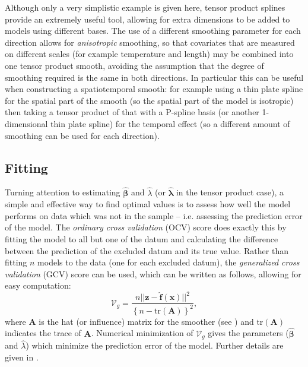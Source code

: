 Although only a very simplistic example is given here, tensor product splines provide an extremely useful tool, allowing for extra dimensions to be added to models using different bases. The use of a different smoothing parameter for each direction allows for \textit{anisotropic} smoothing, so that covariates that are measured on different scales (for example temperature and length) may be combined into one tensor product smooth, avoiding the assumption that the degree of smoothing required is the same in both directions. In particular this can be useful when constructing a spatiotemporal smooth: for example using a thin plate spline for the spatial part of the smooth (so the spatial part of the model is isotropic) then taking a tensor product of that with a P-spline basis (or another 1-dimensional thin plate spline) for the temporal effect (so a different amount of smoothing can be used for each direction).

\subsection{Fitting}
\label{GAMfitting}

Turning attention to estimating $\bm{\hat{\beta}}$ and $\hat{\lambda}$ (or $\hat{\bm{\lambda}}$ in the tensor product case), a simple and effective way to find optimal values is to assess how well the model performs on data which was not in the sample -- i.e. assessing the prediction error of the model. The \textit{ordinary cross validation} (OCV) score does exactly this by fitting the model to all but one of the datum and calculating the difference between the prediction of the excluded datum and its true value. Rather than fitting $n$ models to the data (one for each excluded datum), the \textit{generalized cross validation} (GCV) score can be used, which can be written as follows, allowing for easy computation:
\begin{equation}
\mathcal{V}_g = \frac{n \lvert\lvert \mathbf{z} - \mathbf{\hat{f}}(\mathbf{x})\rvert \rvert^2}{\left \{n-\text{tr}(\mathbf{A}) \right \}^2},
\label{intro-GCV}
\end{equation}
where $\mathbf{A}$ is the hat (or influence) matrix for the smoother (see ) and $\text{tr}(\mathbf{A})$ indicates the trace of $\mathbf{A}$. Numerical minimization of $\mathcal{V}_g$ gives the parameters ($\bm{\hat{\beta}}$ and $\hat{\lambda}$) which minimize the prediction error of the model. Further details are given in . 



